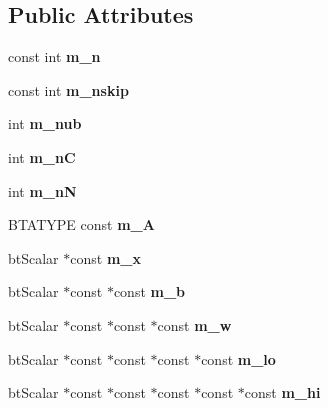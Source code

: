 \subsection*{Public Attributes}
\begin{DoxyCompactItemize}
\item 
\mbox{\label{structbtLCP_ac8c8fd565e74f55450f4abdd04954c92}} 
const int {\bfseries m\+\_\+n}
\item 
\mbox{\label{structbtLCP_ae8ec68abc6a78202c1533581104f164a}} 
const int {\bfseries m\+\_\+nskip}
\item 
\mbox{\label{structbtLCP_a51d9683d575838c18ad046dffa52a0c5}} 
int {\bfseries m\+\_\+nub}
\item 
\mbox{\label{structbtLCP_aeee48c144803b6279e9d89f5a3d5274e}} 
int {\bfseries m\+\_\+nC}
\item 
\mbox{\label{structbtLCP_a7ec31227dca361284651e5d52c0fd564}} 
int {\bfseries m\+\_\+nN}
\item 
\mbox{\label{structbtLCP_a1c0a8e6fc3f21e89ec2c4cddd11cf73e}} 
B\+T\+A\+T\+Y\+PE const {\bfseries m\+\_\+A}
\item 
\mbox{\label{structbtLCP_aead7fa2a27c86cc54d606aa51d715464}} 
bt\+Scalar $\ast$const {\bfseries m\+\_\+x}
\item 
\mbox{\label{structbtLCP_addda0b0a2a2cb39f4321b11353c50a86}} 
bt\+Scalar $\ast$const $\ast$const {\bfseries m\+\_\+b}
\item 
\mbox{\label{structbtLCP_af142d857c3eead5ef1c7156ac6f62416}} 
bt\+Scalar $\ast$const $\ast$const $\ast$const {\bfseries m\+\_\+w}
\item 
\mbox{\label{structbtLCP_a326b08ad06b1e152f15935d28796f04c}} 
bt\+Scalar $\ast$const $\ast$const $\ast$const $\ast$const {\bfseries m\+\_\+lo}
\item 
\mbox{\label{structbtLCP_a85a59f1bd03c3b8adfaa200efa1f7574}} 
bt\+Scalar $\ast$const $\ast$const $\ast$const $\ast$const $\ast$const {\bfseries m\+\_\+hi}

\end{DoxyCompactItemize}
